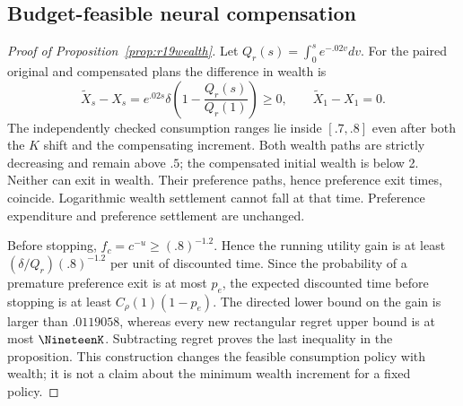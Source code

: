 \subsection{Budget-feasible neural compensation}
\begin{proof}[Proof of Proposition~\ref{prop:r19wealth}]
Let $Q_r(s)=\int_0^se^{-.02v}dv$. For the paired original and compensated plans the difference in wealth is
\[
 \widetilde X_s-X_s=e^{.02s}\delta\left(1-\frac{Q_r(s)}{Q_r(1)}\right)\geq0,
 \qquad \widetilde X_1-X_1=0.
\]
The independently checked consumption ranges lie inside $[.7,.8]$ even after both the $K$ shift and the compensating increment. Both wealth paths are strictly decreasing and remain above $.5$; the compensated initial wealth is below 2. Neither can exit in wealth. Their preference paths, hence preference exit times, coincide. Logarithmic wealth settlement cannot fall at that time. Preference expenditure and preference settlement are unchanged.

Before stopping, $f_c=c^{-u}\geq(.8)^{-1.2}$. Hence the running utility gain is at least $(\delta/Q_r)(.8)^{-1.2}$ per unit of discounted time. Since the probability of a premature preference exit is at most $p_e$, the expected discounted time before stopping is at least $C_\rho(1)(1-p_e)$. The directed lower bound on the gain is larger than $.0119058$, whereas every new rectangular regret upper bound is at most $\NineteenK$. Subtracting regret proves the last inequality in the proposition. This construction changes the feasible consumption policy with wealth; it is not a claim about the minimum wealth increment for a fixed policy.
\end{proof}


